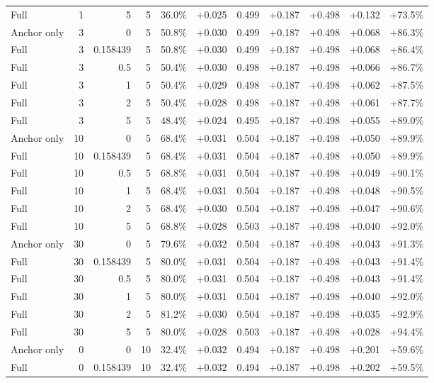 \begin{table}[htbp]
\begin{tabular}{lrrrccccccc}
Full & 1 & 5 & 5 & 36.0\% & +0.025 & 0.499 & +0.187 & +0.498 & +0.132 & +73.5\% \\
Anchor only & 3 & 0 & 5 & 50.8\% & +0.030 & 0.499 & +0.187 & +0.498 & +0.068 & +86.3\% \\
Full & 3 & 0.158439 & 5 & 50.8\% & +0.030 & 0.499 & +0.187 & +0.498 & +0.068 & +86.4\% \\
Full & 3 & 0.5 & 5 & 50.4\% & +0.030 & 0.498 & +0.187 & +0.498 & +0.066 & +86.7\% \\
Full & 3 & 1 & 5 & 50.4\% & +0.029 & 0.498 & +0.187 & +0.498 & +0.062 & +87.5\% \\
Full & 3 & 2 & 5 & 50.4\% & +0.028 & 0.498 & +0.187 & +0.498 & +0.061 & +87.7\% \\
Full & 3 & 5 & 5 & 48.4\% & +0.024 & 0.495 & +0.187 & +0.498 & +0.055 & +89.0\% \\
Anchor only & 10 & 0 & 5 & 68.4\% & +0.031 & 0.504 & +0.187 & +0.498 & +0.050 & +89.9\% \\
Full & 10 & 0.158439 & 5 & 68.4\% & +0.031 & 0.504 & +0.187 & +0.498 & +0.050 & +89.9\% \\
Full & 10 & 0.5 & 5 & 68.8\% & +0.031 & 0.504 & +0.187 & +0.498 & +0.049 & +90.1\% \\
Full & 10 & 1 & 5 & 68.4\% & +0.031 & 0.504 & +0.187 & +0.498 & +0.048 & +90.5\% \\
Full & 10 & 2 & 5 & 68.4\% & +0.030 & 0.504 & +0.187 & +0.498 & +0.047 & +90.6\% \\
Full & 10 & 5 & 5 & 68.8\% & +0.028 & 0.503 & +0.187 & +0.498 & +0.040 & +92.0\% \\
Anchor only & 30 & 0 & 5 & 79.6\% & +0.032 & 0.504 & +0.187 & +0.498 & +0.043 & +91.3\% \\
Full & 30 & 0.158439 & 5 & 80.0\% & +0.031 & 0.504 & +0.187 & +0.498 & +0.043 & +91.4\% \\
Full & 30 & 0.5 & 5 & 80.0\% & +0.031 & 0.504 & +0.187 & +0.498 & +0.043 & +91.4\% \\
Full & 30 & 1 & 5 & 80.0\% & +0.031 & 0.504 & +0.187 & +0.498 & +0.040 & +92.0\% \\
Full & 30 & 2 & 5 & 81.2\% & +0.030 & 0.504 & +0.187 & +0.498 & +0.035 & +92.9\% \\
Full & 30 & 5 & 5 & 80.0\% & +0.028 & 0.503 & +0.187 & +0.498 & +0.028 & +94.4\% \\
Anchor only & 0 & 0 & 10 & 32.4\% & +0.032 & 0.494 & +0.187 & +0.498 & +0.201 & +59.6\% \\
Full & 0 & 0.158439 & 10 & 32.4\% & +0.032 & 0.494 & +0.187 & +0.498 & +0.202 & +59.5\% \\

\end{tabular}
\end{table}
